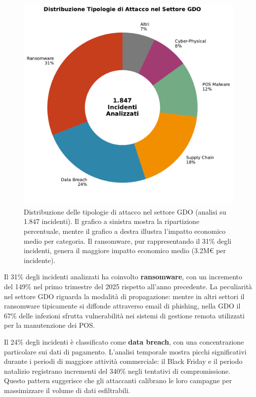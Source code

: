 \begin{figure}[htbp]
\centering
\includegraphics[width=\textwidth]{thesis_figures/cap2/fig_2_2_attack_types.pdf}
\caption{Distribuzione delle tipologie di attacco nel settore GDO (analisi su 1.847 incidenti). Il grafico a sinistra mostra la ripartizione percentuale, mentre il grafico a destra illustra l'impatto economico medio per categoria. Il ransomware, pur rappresentando il 31\% degli incidenti, genera il maggiore impatto economico medio (3.2M€ per incidente).}
\label{fig:attack_types}
\end{figure}

Il 31\% degli incidenti analizzati ha coinvolto \textbf{ransomware}, con un incremento del 149\% nel primo trimestre del 2025 rispetto all'anno precedente\autocite{checkpoint2025}. La peculiarità nel settore GDO riguarda la modalità di propagazione: mentre in altri settori il ransomware tipicamente si diffonde attraverso email di phishing, nella GDO il 67\% delle infezioni sfrutta vulnerabilità nei sistemi di gestione remota utilizzati per la manutenzione dei POS.

Il 24\% degli incidenti è classificato come \textbf{data breach}, con una concentrazione particolare sui dati di pagamento. L'analisi temporale mostra picchi significativi durante i periodi di maggiore attività commerciale: il Black Friday e il periodo natalizio registrano incrementi del 340\% negli tentativi di compromissione. Questo pattern suggerisce che gli attaccanti calibrano le loro campagne per massimizzare il volume di dati esfiltrabili.

